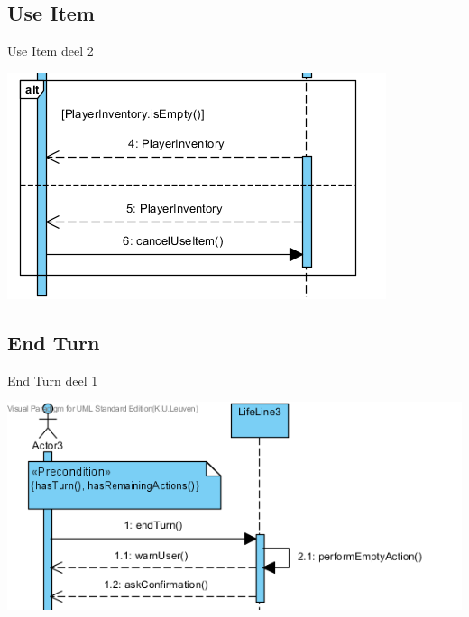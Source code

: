 \documentclass[t]{beamer}
\begin{document}
\subsection{Use Item}
\begin{frame}{Use Item deel 2}
\begin{center}
\includegraphics[scale=0.9]{images/SSDUseItem2}
\end{center}
\end{frame}

\subsection{End Turn}
\begin{frame}{End Turn deel 1}
\begin{center}
\includegraphics[scale=0.8]{images/SSDEndTurn1}
\end{center}
\end{frame}
\end{document}
